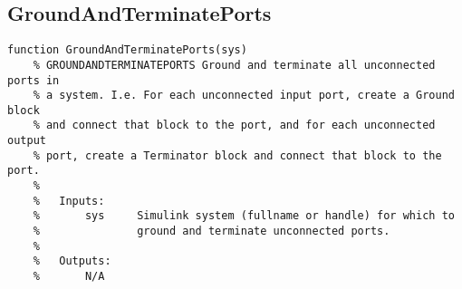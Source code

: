 \documentclass[12pt,letterpaper]{report}
\begin{document}
	\subsection{GroundAndTerminatePorts}
\begin{lstlisting}
function GroundAndTerminatePorts(sys)
    % GROUNDANDTERMINATEPORTS Ground and terminate all unconnected ports in
    % a system. I.e. For each unconnected input port, create a Ground block
    % and connect that block to the port, and for each unconnected output
    % port, create a Terminator block and connect that block to the port.
    %
    % 	Inputs:
    % 		sys     Simulink system (fullname or handle) for which to
    %               ground and terminate unconnected ports.
    %
    % 	Outputs:
    %		N/A
\end{lstlisting}
	
\end{document}
